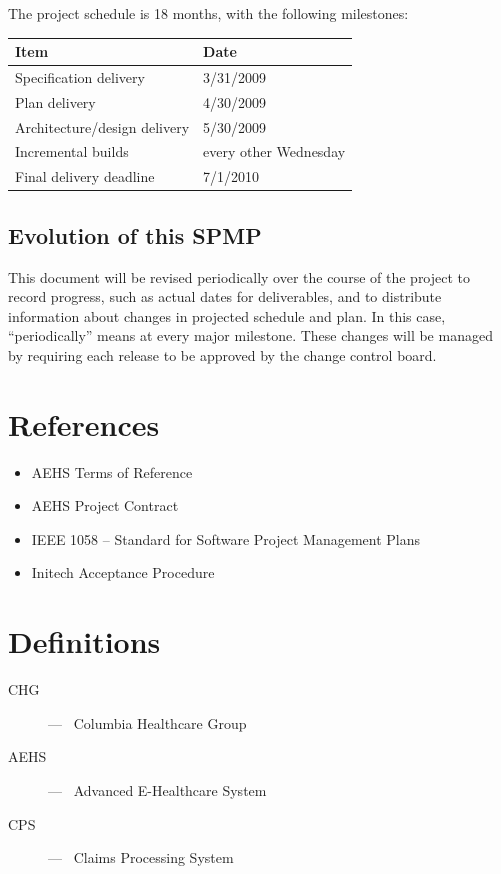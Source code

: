 \documentclass[11pt]{article}
\begin{document}
The project schedule is 18 months, with the following milestones:

\begin{center}
  \begin{tabulary}{\textwidth}{L|l}
    \bf{Item}                    & \bf{Date}             \\
    \hline \hline
    Specification delivery       & 3/31/2009             \\
    Plan delivery                & 4/30/2009             \\
    Architecture/design delivery & 5/30/2009             \\
    Incremental builds           & every other Wednesday \\
    Final delivery deadline      & 7/1/2010
  \end{tabulary}
\end{center}


\subsection{Evolution of this SPMP}
This document will be revised periodically over the course of the project to record progress, such
as actual dates for deliverables, and to distribute information about changes in projected schedule
and plan.  In this case, ``periodically'' means at every major milestone.  These changes will be
managed by requiring each release to be approved by the change control board.



\section{References}
\begin{itemize}
\item AEHS Terms of Reference
\item AEHS Project Contract
\item IEEE 1058 -- Standard for Software Project Management Plans
\item Initech Acceptance Procedure
\end{itemize}


\section{Definitions}
\begin{description}
\item[CHG] ---~ Columbia Healthcare Group
\item[AEHS] ---~ Advanced E-Healthcare System
\item[CPS] ---~ Claims Processing System
\end{description}
\end{document}
